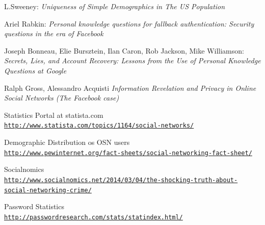 \documentclass[10pt,conference]{IEEEtran}
\begin{document}
\begin{thebibliography}{1}
L.Sweeney: 
\textit{Uniqueness of Simple Demographics in The US Population}

Ariel Rabkin: 
\textit{Personal knowledge questions for fallback authentication: Security questions in the era of Facebook}

Joseph Bonneau, Elie Bursztein, Ilan Caron, Rob Jackson, Mike Williamson:
\textit{Secrets, Lies, and Account Recovery: Lessons from the Use of Personal Knowledge Questions at Google}

Ralph Gross, Alessandro Acquisti
\textit{Information Revelation and Privacy in Online Social Networks (The Facebook case)}

Statistics Portal at statista.com
\\\texttt{\url{http://www.statista.com/topics/1164/social-networks/}}

Demographic Distribution os OSN users
\\\texttt{\url{http://www.pewinternet.org/fact-sheets/social-networking-fact-sheet/}}

Socialnomics
\\\texttt{\url{http://www.socialnomics.net/2014/03/04/the-shocking-truth-about-social-networking-crime/}}

Password Statistics
\\\texttt{\url{http://passwordresearch.com/stats/statindex.html/}}




%
%



\end{thebibliography}
\end{document}
